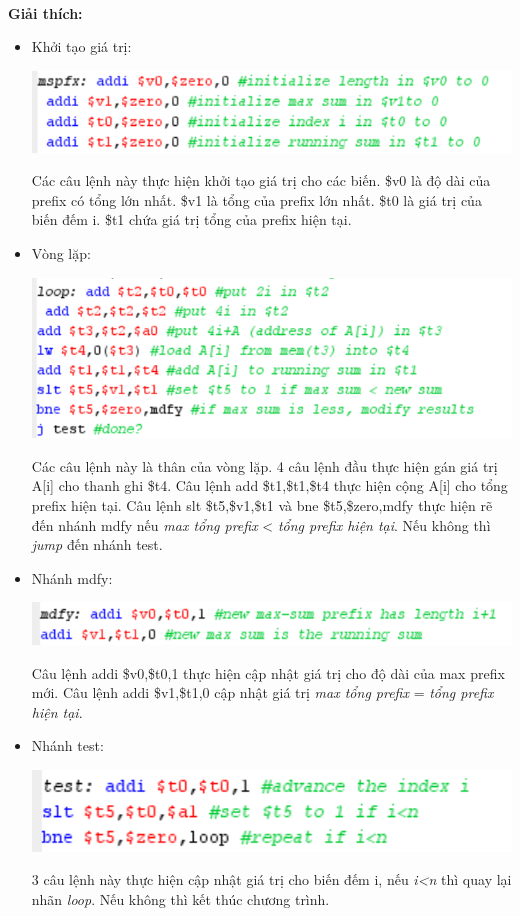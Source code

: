 \documentclass[12pt,a4paper,oneside]{article}
\begin{document}
\\\textbf{Giải thích:}
\begin{itemize}
	\item Khởi tạo giá trị:\begin{center}
	\includegraphics[scale=1]{1.1}
	\end{center}
		Các câu lệnh này thực hiện khởi tạo giá trị cho các biến. \$v0 là độ dài của prefix có tổng lớn nhất. \$v1 là tổng của prefix lớn nhất. \$t0 là giá trị của biến đếm i. \$t1 chứa giá trị tổng của prefix hiện tại.
	\item Vòng lặp:\begin{center}
	 \includegraphics[scale=1]{1.2}
	\end{center}
		Các câu lệnh này là thân của vòng lặp. 4 câu lệnh đầu thực hiện gán giá trị A[i] cho thanh ghi \$t4. Câu lệnh \colorbox{code}{add \$t1,\$t1,\$t4} thực hiện cộng A[i] cho tổng prefix hiện tại. Câu lệnh \colorbox{code}{slt \$t5,\$v1,\$t1} và \colorbox{code}{bne \$t5,\$zero,mdfy} thực hiện rẽ đến nhánh mdfy nếu \textit{max tổng prefix} < \textit{tổng prefix hiện tại}. Nếu không thì \textit{jump} đến nhánh test.
	\item Nhánh mdfy:\begin{center}
	\includegraphics[scale=1]{1.3}
	\end{center}
	Câu lệnh \colorbox{code}{addi \$v0,\$t0,1} thực hiện cập nhật giá trị cho độ dài của max prefix mới. Câu lệnh \colorbox{code}{addi \$v1,\$t1,0} cập nhật giá trị \textit{max tổng prefix} = \textit{tổng prefix hiện tại}.
	\item Nhánh test: \begin{center}
	\includegraphics[scale=1]{1.4}
	\end{center}
	3 câu lệnh này thực hiện cập nhật giá trị cho biến đếm i, nếu \textit{i<n} thì quay lại nhãn \textit{loop}. Nếu không thì kết thúc chương trình.
\end{itemize}
\pagebreak
\end{document}
